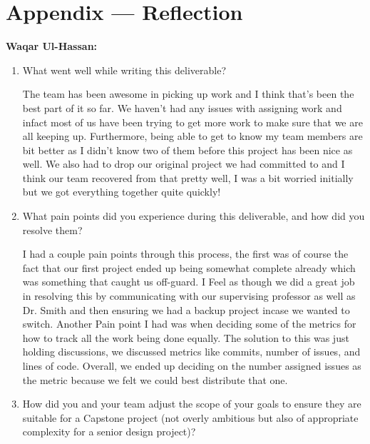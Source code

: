 \documentclass{article}
\begin{document}
\newpage{}

\section*{Appendix --- Reflection}



\textbf{Waqar Ul-Hassan:}

\begin{enumerate}
    \item What went well while writing this deliverable?

          The team has been awesome in picking up work and I think that's been
          the best part of it so far. We haven't had any issues with assigning
          work and infact most of us have been trying to get more work to make
          sure that we are all keeping up. Furthermore, being able to get to
          know my team members are bit better as I didn't know two of them
          before this project has been nice as well. We also had to drop our
          original project  we had committed to and I think our team recovered
          from that pretty well, I was a bit worried initially but we got
          everything together quite quickly!

    \item What pain points did you experience during this deliverable, and how
          did you resolve them?

          I had a couple pain points through this process, the first was of
          course the fact that our first project ended up being somewhat
          complete already which was something that caught us off-guard. I Feel
          as though we did a great job in resolving this by communicating with
          our supervising professor as well as Dr. Smith and then ensuring we
          had a backup project incase we wanted to switch. Another Pain point I
          had was when deciding some of the metrics for how to track all the
          work being done equally. The solution to this was just holding
          discussions, we discussed metrics like commits, number of issues, and
          lines of code. Overall, we ended up deciding on the number assigned
          issues as the metric because we felt we could best distribute that
          one.

    \item How did you and your team adjust the scope of your goals to ensure
          they are suitable for a Capstone project (not overly ambitious but
          also of appropriate complexity for a senior design project)?


\end{enumerate}
\end{document}
